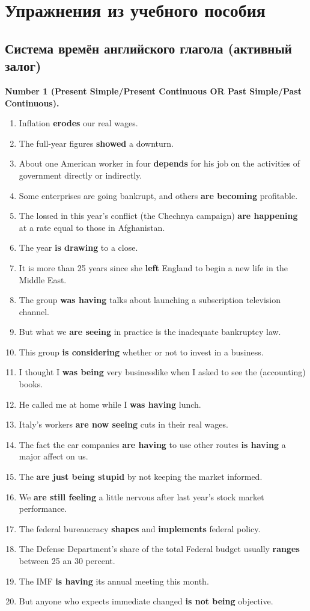\documentclass[main.tex]{subfiles}
\begin{document}
\setcounter{secnumdepth}{0}

\section{Упражнения из учебного пособия}

\subsection{Система времён английского глагола (активный залог)}

\textbf{Number 1 (Present Simple/Present Continuous OR Past Simple/Past Continuous).}

\begin{enumerate}[nosep]
	\item Inflation \textbf{erodes} our real wages.
	\item The full-year figures \textbf{showed} a downturn.
	\item About one American worker in four \textbf{depends} for his job on the activities of government directly or indirectly.
	\item Some enterprises are going bankrupt, and others \textbf{are becoming} profitable.
	\item The lossed in this year's conflict (the Chechnya campaign) \textbf{are happening} at a rate equal to those in Afghanistan.
	\item The year \textbf{is drawing} to a close.
	\item It is more than 25 years since she \textbf{left} England to begin a new life in the Middle East.
	\item The group \textbf{was having} talks about launching a subscription television channel.
	\item But what we \textbf{are seeing} in practice is the inadequate bankruptcy law.
	\item This group \textbf{is considering} whether or not to invest in a business.
	\item I thought I \textbf{was being} very businesslike when I asked to see the (accounting) books.
	\item He called me at home while I \textbf{was having} lunch.
	\item Italy's workers \textbf{are now seeing} cuts in their real wages.
	\item The fact the car companies \textbf{are having} to use other routes \textbf{is having} a major affect on us.
	\item The \textbf{are just being stupid} by not keeping the market informed.
	\item We \textbf{are still feeling} a little nervous after last year's stock market performance.
	\item The federal bureaucracy \textbf{shapes} and \textbf{implements} federal policy.
	\item The Defense Department's share of the total Federal budget usually \textbf{ranges} between 25 an 30 percent.
	\item The IMF \textbf{is having} its annual meeting this month.
	\item But anyone who expects immediate changed \textbf{is not being} objective.
\end{enumerate}
\end{document}
